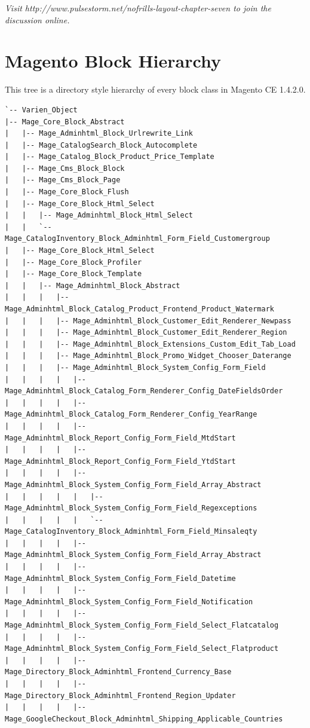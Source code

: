 \documentclass[oneside]{book}
\begin{document}
\emph{Visit http://www.pulsestorm.net/nofrills-layout-chapter-seven to join the discussion online.}
\appendix
\chapter{Magento Block Hierarchy}
This tree is a directory style hierarchy of every block class in Magento CE 1.4.2.0. 

\begin{lstlisting}
`-- Varien_Object
|-- Mage_Core_Block_Abstract
|   |-- Mage_Adminhtml_Block_Urlrewrite_Link
|   |-- Mage_CatalogSearch_Block_Autocomplete
|   |-- Mage_Catalog_Block_Product_Price_Template
|   |-- Mage_Cms_Block_Block
|   |-- Mage_Cms_Block_Page
|   |-- Mage_Core_Block_Flush
|   |-- Mage_Core_Block_Html_Select
|   |   |-- Mage_Adminhtml_Block_Html_Select
|   |   `-- Mage_CatalogInventory_Block_Adminhtml_Form_Field_Customergroup
|   |-- Mage_Core_Block_Html_Select
|   |-- Mage_Core_Block_Profiler
|   |-- Mage_Core_Block_Template
|   |   |-- Mage_Adminhtml_Block_Abstract
|   |   |   |-- Mage_Adminhtml_Block_Catalog_Product_Frontend_Product_Watermark
|   |   |   |-- Mage_Adminhtml_Block_Customer_Edit_Renderer_Newpass
|   |   |   |-- Mage_Adminhtml_Block_Customer_Edit_Renderer_Region
|   |   |   |-- Mage_Adminhtml_Block_Extensions_Custom_Edit_Tab_Load
|   |   |   |-- Mage_Adminhtml_Block_Promo_Widget_Chooser_Daterange
|   |   |   |-- Mage_Adminhtml_Block_System_Config_Form_Field
|   |   |   |   |-- Mage_Adminhtml_Block_Catalog_Form_Renderer_Config_DateFieldsOrder
|   |   |   |   |-- Mage_Adminhtml_Block_Catalog_Form_Renderer_Config_YearRange
|   |   |   |   |-- Mage_Adminhtml_Block_Report_Config_Form_Field_MtdStart
|   |   |   |   |-- Mage_Adminhtml_Block_Report_Config_Form_Field_YtdStart
|   |   |   |   |-- Mage_Adminhtml_Block_System_Config_Form_Field_Array_Abstract
|   |   |   |   |   |-- Mage_Adminhtml_Block_System_Config_Form_Field_Regexceptions
|   |   |   |   |   `-- Mage_CatalogInventory_Block_Adminhtml_Form_Field_Minsaleqty
|   |   |   |   |-- Mage_Adminhtml_Block_System_Config_Form_Field_Array_Abstract
|   |   |   |   |-- Mage_Adminhtml_Block_System_Config_Form_Field_Datetime
|   |   |   |   |-- Mage_Adminhtml_Block_System_Config_Form_Field_Notification
|   |   |   |   |-- Mage_Adminhtml_Block_System_Config_Form_Field_Select_Flatcatalog
|   |   |   |   |-- Mage_Adminhtml_Block_System_Config_Form_Field_Select_Flatproduct
|   |   |   |   |-- Mage_Directory_Block_Adminhtml_Frontend_Currency_Base
|   |   |   |   |-- Mage_Directory_Block_Adminhtml_Frontend_Region_Updater
|   |   |   |   |-- Mage_GoogleCheckout_Block_Adminhtml_Shipping_Applicable_Countries

\end{lstlisting}
\end{document}
